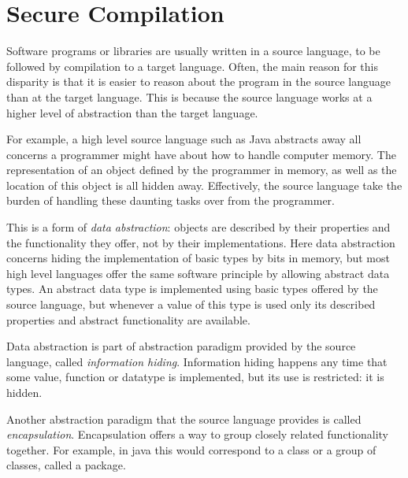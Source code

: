 \section{Secure Compilation}
\label{sec:SecureCompilation}
Software programs or libraries are usually written in a source language, to be followed by compilation to a target language.
Often, the main reason for this disparity is that it is easier to reason about the program in the source language than at the target language.
This is because the source language works at a higher level of abstraction than the target language.

For example, a high level source language such as Java abstracts away all concerns a programmer might have about how to handle computer memory.
The representation of an object defined by the programmer in memory, as well as the location of this object is all hidden away.
Effectively, the source language take the burden of handling these daunting tasks over from the programmer.

This is a form of \emph{data abstraction}: objects are described by their properties and the functionality they offer, not by their implementations.
Here data abstraction concerns hiding the implementation of basic types by bits in memory, but most high level languages offer the same software principle by allowing abstract data types. 
An abstract data type is implemented using basic types offered by the source language, but whenever a value of this type is used only its described properties and abstract functionality are available.

Data abstraction is part of abstraction paradigm provided by the source language, called \emph{information hiding}.
Information hiding happens any time that some value, function or datatype is implemented, but its use is restricted: it is hidden.

Another abstraction paradigm that the source language provides is called \emph{encapsulation}.
Encapsulation offers a way to group closely related functionality together. For example, in java this would correspond to a class or a group of classes, called a package.

